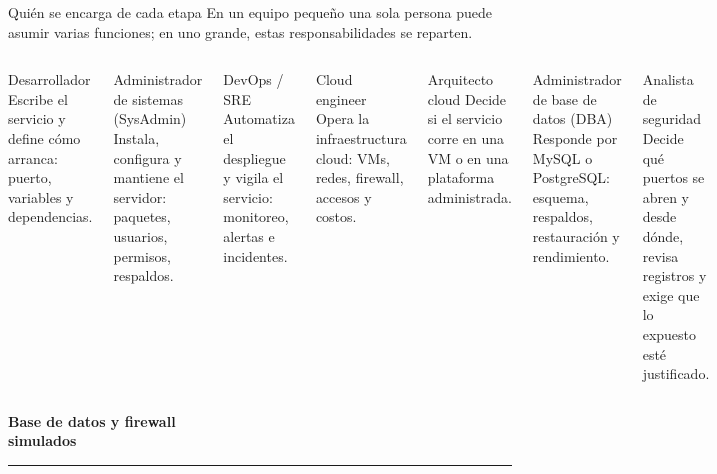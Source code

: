 \documentclass[aspectratio=169,10pt,c]{beamer}
\begin{document}
\begin{frame}{Quién se encarga de cada etapa}
\small En un equipo pequeño una sola persona puede asumir varias funciones; en uno grande, estas responsabilidades se reparten.
\vspace{2mm}
\begin{columns}[T,onlytextwidth]
\begin{exampleblock}{Desarrollador}
\small Escribe el servicio y define cómo arranca: puerto, variables y dependencias.
\end{exampleblock}
\begin{exampleblock}{Administrador de sistemas \textnormal{\scriptsize(SysAdmin)}}
\small Instala, configura y mantiene el servidor: paquetes, usuarios, permisos, respaldos.
\end{exampleblock}
\begin{exampleblock}{DevOps / SRE}
\small Automatiza el despliegue y vigila el servicio: monitoreo, alertas e incidentes.
\end{exampleblock}
\begin{exampleblock}{Cloud engineer}
\small Opera la infraestructura cloud: VMs, redes, firewall, accesos y costos.
\end{exampleblock}
\begin{exampleblock}{Arquitecto cloud}
\small Decide si el servicio corre en una VM o en una plataforma administrada.
\end{exampleblock}
\begin{exampleblock}{Administrador de base de datos \textnormal{\scriptsize(DBA)}}
\small Responde por MySQL o PostgreSQL: esquema, respaldos, restauración y rendimiento.
\end{exampleblock}
\begin{exampleblock}{Analista de seguridad}
\small Decide qué puertos se abren y desde dónde, revisa registros y exige que lo expuesto esté justificado.
\end{exampleblock}
\end{columns}
\end{frame}


\begin{frame}[plain]
\vfill
\begin{center}
{\fontsize{29}{34}\selectfont\bfseries Base de datos y firewall\\ simulados}\par
\vspace{4mm}
{\color{utpRojo}\rule{8.5cm}{1.2pt}}
\end{center}
\vfill
\end{frame}
\end{document}
